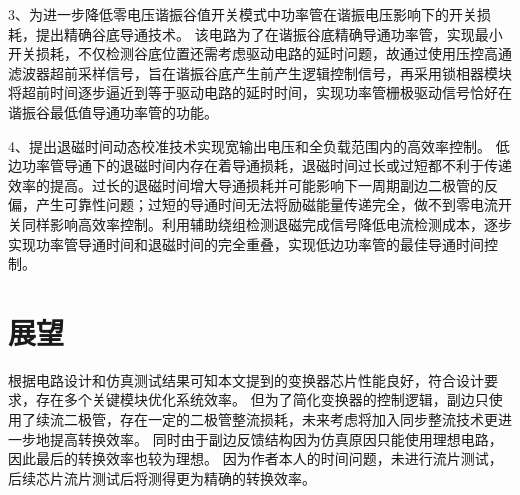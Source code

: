 3、为进一步降低零电压谐振谷值开关模式中功率管在谐振电压影响下的开关损耗，提出精确谷底导通技术。
该电路为了在谐振谷底精确导通功率管，实现最小开关损耗，不仅检测谷底位置还需考虑驱动电路的延时问题，故通过使用压控高通滤波器超前采样信号，旨在谐振谷底产生前产生逻辑控制信号，再采用锁相器模块将超前时间逐步逼近到等于驱动电路的延时时间，实现功率管栅极驱动信号恰好在谐振谷最低值导通功率管的功能。

4、提出退磁时间动态校准技术实现宽输出电压和全负载范围内的高效率控制。
低边功率管导通下的退磁时间内存在着导通损耗，退磁时间过长或过短都不利于传递效率的提高。过长的退磁时间增大导通损耗并可能影响下一周期副边二极管的反偏，产生可靠性问题；过短的导通时间无法将励磁能量传递完全，做不到零电流开关同样影响高效率控制。利用辅助绕组检测退磁完成信号降低电流检测成本，逐步实现功率管导通时间和退磁时间的完全重叠，实现低边功率管的最佳导通时间控制。

\section{展望}

根据电路设计和仿真测试结果可知本文提到的变换器芯片性能良好，符合设计要求，存在多个关键模块优化系统效率。
但为了简化变换器的控制逻辑，副边只使用了续流二极管，存在一定的二极管整流损耗，未来考虑将加入同步整流技术更进一步地提高转换效率。
同时由于副边反馈结构因为仿真原因只能使用理想电路，因此最后的转换效率也较为理想。
因为作者本人的时间问题，未进行流片测试，后续芯片流片测试后将测得更为精确的转换效率。





